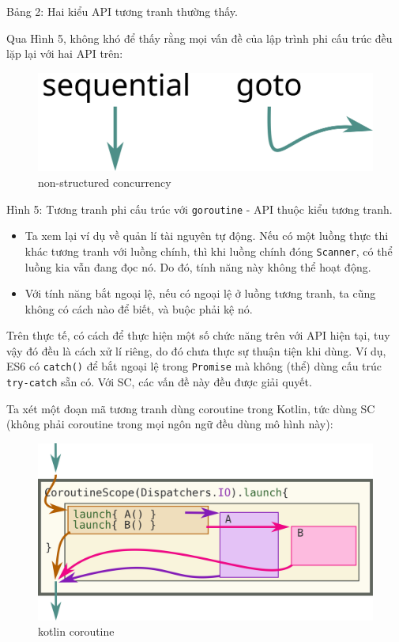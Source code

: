 Bảng 2: Hai kiểu API tương tranh thường thấy.

Qua Hình 5, không khó để thấy rằng mọi vấn đề của lập trình phi cấu trúc
đều lặp lại với hai API trên:

\begin{figure}
  \centering
  \includegraphics{../images/sequential-and-go-to-schematic.svg}
  \caption{non-structured concurrency}
\end{figure}

Hình 5: Tương tranh phi cấu trúc với \texttt{goroutine} - API thuộc kiểu
tương tranh.

\begin{itemize}
  
  \item
        Ta xem lại ví dụ về quản lí tài nguyên tự động. Nếu có một luồng thực
        thi khác tương tranh với luồng chính, thì khi luồng chính đóng
        \texttt{Scanner}, có thể luồng kia vẫn đang đọc nó. Do đó, tính năng này
        không thể hoạt động.
  \item
        Với tính năng bắt ngoại lệ, nếu có ngoại lệ ở luồng tương tranh, ta
        cũng không có cách nào để biết, và buộc phải kệ nó.
\end{itemize}

Trên thực tế, có cách để thực hiện một số chức năng trên với API hiện
tại, tuy vậy đó đều là cách xử lí riêng, do đó chưa thực sự thuận tiện
khi dùng. Ví dụ, ES6 có \texttt{catch()} để bắt ngoại lệ trong
\texttt{Promise} mà không (thể) dùng cấu trúc \texttt{try-catch} sẵn có.
Với SC, các vấn đề này đều được giải quyết.

Ta xét một đoạn mã tương tranh dùng coroutine trong Kotlin, tức dùng SC
(không phải coroutine trong mọi ngôn ngữ đều dùng mô hình này):

\begin{figure}
  \centering
  \includegraphics{../images/kotlin-coroutine.svg}
  \caption{kotlin coroutine}
\end{figure}


